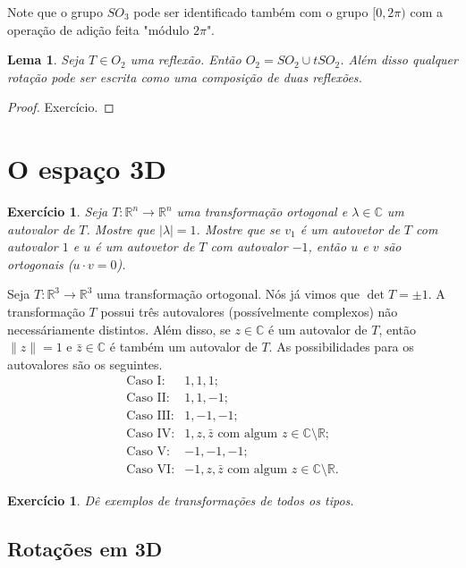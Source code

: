 \documentclass[12pt]{amsart}
\newcommand{\C}{\mathbb C}
\newcommand{\R}{\mathbb R}
\newtheorem{lemma}[theorem]{Lema}
\newtheorem{exercise}[theorem]{Exercício}
\theoremstyle{definition}
\begin{document}
Note que o grupo $SO_3$ pode ser identificado também com o grupo $[0,2\pi)$ com a operação de adição feita 
"módulo $2\pi$".
 
\begin{lemma}
    Seja $T\in O_2$ uma reflexão. Então $O_2=SO_2\cup tSO_2$. Além disso qualquer 
    rotação pode ser escrita como uma composição de duas reflexões.
\end{lemma}
\begin{proof}
    Exercício.
\end{proof}

\section{O espaço 3D}

\begin{exercise}
    Seja $T:\R^n\to \R^n$ uma transformação ortogonal e $\lambda\in\C$ um autovalor de $T$. Mostre que 
    $|\lambda|=1$. Mostre que se $v_1$ é um autovetor de $T$ com autovalor $1$ e $u$ é um autovetor 
    de $T$ com autovalor $-1$, então $u$ e $v$ são ortogonais ($u\cdot v=0$). 
\end{exercise}

Seja $T:\R^3\to\R^3$ uma transformação ortogonal. Nós já vimos que $\det T=\pm 1$.
A transformação $T$ possui três autovalores (possívelmente complexos) não necessáriamente distintos. 
Além disso, se $z\in\C$ é um autovalor de $T$, então $\|z\|=1$ e $\bar z\in\C$ é também um autovalor de $T$. 
As possibilidades para os autovalores são os seguintes.
\begin{align*}
    \mbox{Caso I}:&1,1,1;\\
    \mbox{Caso II}:&1,1,-1;\\
    \mbox{Caso III}:&1,-1,-1;\\
    \mbox{Caso IV}:&1,z,\bar z\mbox{ com algum $z\in\C\setminus\R$};\\
    \mbox{Caso V}:&-1,-1,-1;\\
    \mbox{Caso VI}:&-1,z,\bar z\mbox{ com algum $z\in\C\setminus\R$}.
\end{align*}

\begin{exercise}
    Dê exemplos de transformações de todos os tipos.
\end{exercise}

\subsection{Rotações em 3D}
\end{document}
